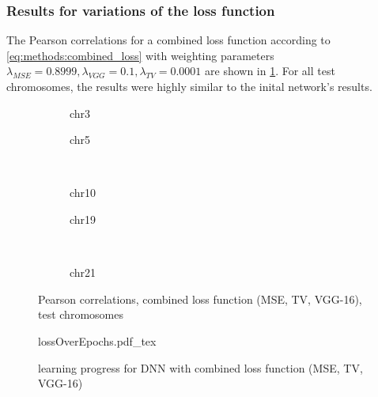 \subsubsection{Results for variations of the loss function} \label{sec:results:loss_functions}
The Pearson correlations for a combined loss function according to \cref{eq:methods:combined_loss} with weighting parameters $\lambda_\mathit{MSE} = 0.8999, \lambda_\mathit{VGG}=0.1, \lambda_\mathit{TV}=0.0001$ are shown in \cref{fig:results:combilossDNN_pearson}.
For all test chromosomes, the results were highly similar to the inital network's results.
\begin{figure}[p]
    \begin{subfigure}{0.45\textwidth}
        \scriptsize
        \caption{chr3}
    \end{subfigure} \hfill
    \begin{subfigure}{0.45\textwidth}
        \scriptsize
        \caption{chr5}
    \end{subfigure}\\[5mm]
    \begin{subfigure}{0.45\textwidth}
        \scriptsize
        \caption{chr10}
    \end{subfigure}\hfill
    \begin{subfigure}{0.45\textwidth}
        \scriptsize
        \caption{chr19}
    \end{subfigure}\\[3mm]
    \centering
    \begin{subfigure}{0.45\textwidth}
        \scriptsize
        \caption{chr21}
    \end{subfigure}
    \caption{Pearson correlations, combined loss function (MSE, TV, VGG-16),  test chromosomes}
    \label{fig:results:combilossDNN_pearson}
\end{figure}
\begin{figure}[hbp]
 \centering
 \scriptsize
 {lossOverEpochs.pdf_tex}
 \caption{learning progress for DNN with combined loss function (MSE, TV, VGG-16)} \label{fig:results:combilossDNN_lossEpochs}
\end{figure}

